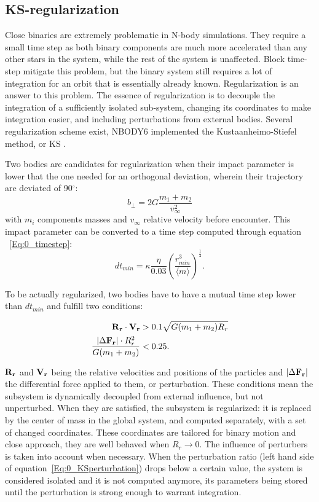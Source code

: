  
\subsection{KS-regularization}

Close binaries are extremely problematic in N-body simulations. They require a small time step as both binary components are much more accelerated than any other stars in the system, while the rest of the system is unaffected. Block time-step mitigate this problem, but the binary system still requires a lot of integration for an orbit that is essentially already known. Regularization is an answer to this problem. The essence of regularization is to decouple the integration of a sufficiently isolated sub-system, changing its coordinates to make integration easier, and including perturbations from external bodies. Several regularization scheme exist, NBODY6 implemented the Kustaanheimo-Stiefel method, or KS \citep{KS1965}.

Two bodies are candidates for regularization when their impact parameter is lower that the one needed for an orthogonal deviation, wherein their trajectory are deviated of 90$^\circ$:
\begin{equation}
b_\perp = 2G \frac{m_1 +m_2}{v^2_\infty}
\end{equation}
with $m_i$ components masses and $v_\infty$ relative velocity before encounter. This impact parameter can be converted to a time step computed through equation ~\ref{Eq:0_timestep}:
\begin{equation}
dt_{min} = \kappa \frac{\eta}{0.03} \left( \frac{r^3_{min}}{\langle m \rangle}\right)^\frac{1}{2}.
\end{equation}

To be actually regularized, two bodies have to have a mutual time step lower than $dt_{min}$ and fulfill two conditions:

\begin{align}
\bold{R_r} \cdot \bold{V_r} &> 0.1 \sqrt{ G(m_1+m_2)R_r}\\
\label{Eq:0_KSperturbation}
\frac{\left| \Delta \bold{F_r} \right| \cdot R^2_r}{G(m_1+m_2)} &< 0.25.
\end{align}

$\bold{R_r}$ and $\bold{V_r}$ being the relative velocities and positions of the particles and $\left| \Delta \bold{F_r} \right|$ the differential force applied to them, or perturbation. These conditions mean the subsystem is dynamically decoupled from external influence, but not unperturbed. When they are satisfied, the subsystem is regularized: it is replaced by the center of mass in the global system, and computed separately, with a set of changed coordinates. These coordinates are tailored for binary motion and close approach, they are well behaved when $R_r \rightarrow 0$. The influence of perturbers is taken into account when necessary. When the perturbation ratio (left hand side of equation~\ref{Eq:0_KSperturbation}) drops below a certain value, the system is considered isolated and it is not computed anymore, its parameters being stored until the perturbation is strong enough to warrant integration.

